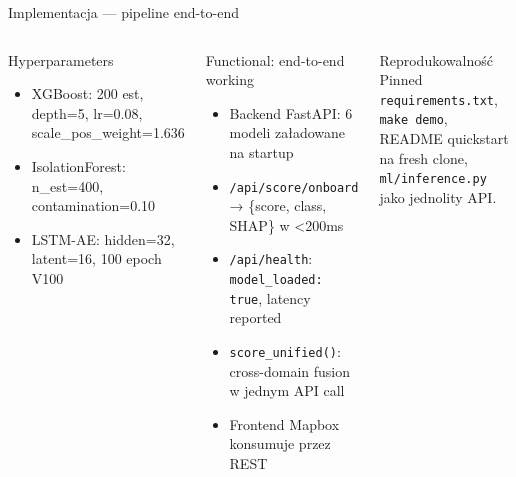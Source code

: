\documentclass[10pt,aspectratio=169]{beamer}
\begin{document}
\begin{frame}{Implementacja — pipeline end-to-end}
\begin{columns}[T,onlytextwidth]
        \begin{block}{Hyperparameters}
            \scriptsize
            \begin{itemize}\setlength\itemsep{0.05em}
                \item XGBoost: 200 est, depth=5, lr=0.08, scale\_pos\_weight=1.636
                \item IsolationForest: n\_est=400, contamination=0.10
                \item LSTM-AE: hidden=32, latent=16, 100 epoch V100
            \end{itemize}
        \end{block}
        \begin{exampleblock}{Functional: end-to-end working}
            \scriptsize
            \begin{itemize}\setlength\itemsep{0.15em}
                \item Backend FastAPI: 6 modeli załadowane na startup
                \item \texttt{/api/score/onboard} → \{score, class, SHAP\} w <200ms
                \item \texttt{/api/health}: \texttt{model\_loaded: true}, latency reported
                \item \texttt{score\_unified()}: cross-domain fusion w jednym API call
                \item Frontend Mapbox konsumuje przez REST
            \end{itemize}
        \end{exampleblock}

        \begin{block}{Reprodukowalność}
            \scriptsize Pinned \texttt{requirements.txt}, \texttt{make demo}, README quickstart na fresh clone, \texttt{ml/inference.py} jako jednolity API.
        \end{block}
    \end{columns}
\end{frame}
\end{document}
